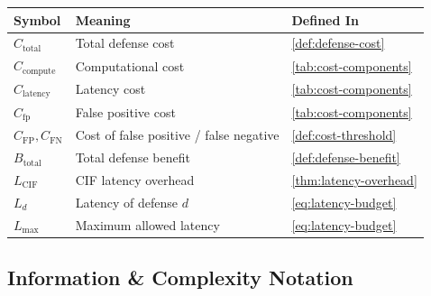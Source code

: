 \documentclass[
]{article}
\newcounter{none} %
\begin{document}
{\def\LTcaptype{none} %
\begin{longtable}[]{@{}
  >{\raggedright\arraybackslash}p{}
  >{\raggedright\arraybackslash}p{}
  >{\raggedright\arraybackslash}p{}@{}}
\toprule\noalign{}
\begin{minipage}[b]{\linewidth}\raggedright
Symbol
\end{minipage} & \begin{minipage}[b]{\linewidth}\raggedright
Meaning
\end{minipage} & \begin{minipage}[b]{\linewidth}\raggedright
Defined In
\end{minipage} \\
\midrule\noalign{}
\endhead
\bottomrule\noalign{}
\endlastfoot
\(C_{\text{total}}\) & Total defense cost & \cref{def:defense-cost} \\
\(C_{\text{compute}}\) & Computational cost &
\cref{tab:cost-components} \\
\(C_{\text{latency}}\) & Latency cost & \cref{tab:cost-components} \\
\(C_{\text{fp}}\) & False positive cost & \cref{tab:cost-components} \\
\(C_{\text{FP}}, C_{\text{FN}}\) & Cost of false positive / false
negative & \cref{def:cost-threshold} \\
\(B_{\text{total}}\) & Total defense benefit &
\cref{def:defense-benefit} \\
\(L_{\text{CIF}}\) & CIF latency overhead &
\cref{thm:latency-overhead} \\
\(L_d\) & Latency of defense \(d\) & \cref{eq:latency-budget} \\
\(L_{\max}\) & Maximum allowed latency & \cref{eq:latency-budget} \\
\end{longtable}
}

\subsection{Information \& Complexity
Notation}\label{information-complexity-notation}
\end{document}
